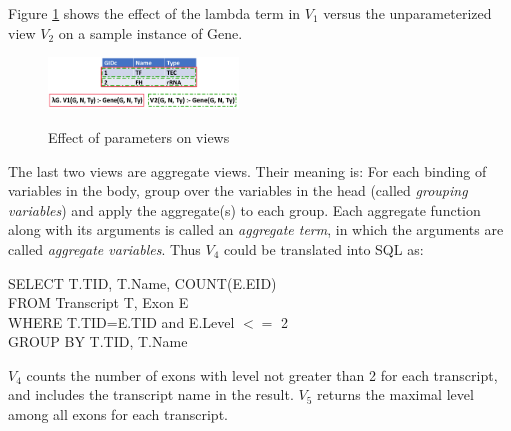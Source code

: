 Figure \ref{fig:lambda} shows the effect of the lambda term in $V_1$ versus the unparameterized view $V_2$ on a sample instance of Gene.
\begin{figure}[t!]
    \centering
    \includegraphics[width=0.45\textwidth,height=0.11\textwidth]{Figures/GIDsExample.pdf}
    \caption{Effect of parameters on views}
    \small \label{fig:lambda}
\end{figure}
The last two views are aggregate views. Their meaning is:  For each binding of variables in the body, group over the variables  in the head (called {\em grouping variables}) and apply the aggregate(s) to each group. Each {aggregate function} along with its arguments is called an {\em aggregate term}, in which the arguments are called {\em aggregate variables}.
Thus $V_4$ could be translated into SQL as:
\begin{tabbing}
SELECT T.TID, T.Name, COUNT(E.EID)\\
FROM Transcript T, Exon E\\
WHERE T.TID=E.TID and E.Level $<=$ 2\\
GROUP BY T.TID, T.Name
\end{tabbing}
$V_4$ counts the number of exons  with level not greater than 2 for each transcript, and includes the transcript name in the result.
$V_5$ returns the maximal level among all exons for each transcript. 

